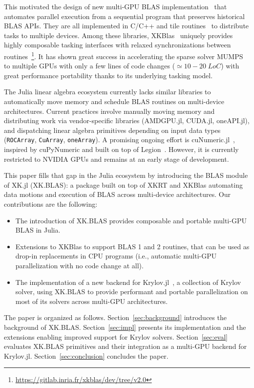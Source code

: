 \documentclass{juliacon}
\begin{document}
This motivated the design of new multi-GPU BLAS implementation~\cite{BLASX, XKBlas, cublasXT, Chameleon, parsec24, MAGMA24, SLATE, PARALIA} that automates parallel execution from a sequential program that preserves historical BLAS APIs.
They are all implemented in C/C++ and tile routines~\cite{tile-blas} to distribute tasks to multiple devices.
Among these libraries, XKBlas~\cite{XKBlas} uniquely provides highly composable tasking interfaces with relaxed synchronizations between routines~\footnote{\url{https://gitlab.inria.fr/xkblas/dev/tree/v2.0}}.
It has shown great success in accelerating the sparse solver MUMPS~\cite{mumps} to multiple GPUs with only a few lines of code changes ($\simeq 10-20 \; LoC$) with great performance portability thanks to its underlying tasking model.

The Julia linear algebra ecosystem currently lacks similar libraries to automatically move memory and schedule BLAS routines on multi-device architectures.
Current practices involve manually moving memory and distributing work via vendor-specific libraries (AMDGPU.jl, CUDA.jl, oneAPI.jl), and dispatching linear algebra primitives depending on input data types (\texttt{ROCArray}, \texttt{CuArray}, \texttt{oneArray}).
A promising ongoing effort is cuNumeric.jl~\cite{krasowska2025reducing}, inspired by cuPyNumeric and built on top of Legion~\cite{legion}.
However, it is currently restricted to NVIDIA GPUs and remains at an early stage of development.

This paper fills that gap in the Julia ecosystem by introducing the BLAS module of XK.jl (XK.BLAS): a package built on top of XKRT and XKBlas automating data motions and execution of BLAS across multi-device architectures.
Our contributions are the following:
\begin{itemize}
    \item[$\bullet$] The introduction of XK.BLAS provides composable and portable multi-GPU BLAS in Julia.
    \item[$\bullet$] Extensions to XKBlas to support BLAS 1 and 2 routines, that can be used as drop-in replacements in CPU programs (i.e., automatic multi-GPU parallelization with no code change at all).
    \item[$\bullet$] The implementation of a new backend for Krylov.jl~\cite{montoison-orban-2023}, a collection of Krylov solver, using XK.BLAS to provide performant and portable parallelization on most of its solvers across multi-GPU architectures.
\end{itemize}
The paper is organized as follows.  
Section~\ref{sec:background} introduces the background of XK.BLAS.  
Section~\ref{sec:impl} presents its implementation and the extensions enabling improved support for Krylov solvers.
Section~\ref{sec:eval} evaluates XK.BLAS primitives and their integration as a multi-GPU backend for Krylov.jl.  
Section~\ref{sec:conclusion} concludes the paper.
\end{document}
